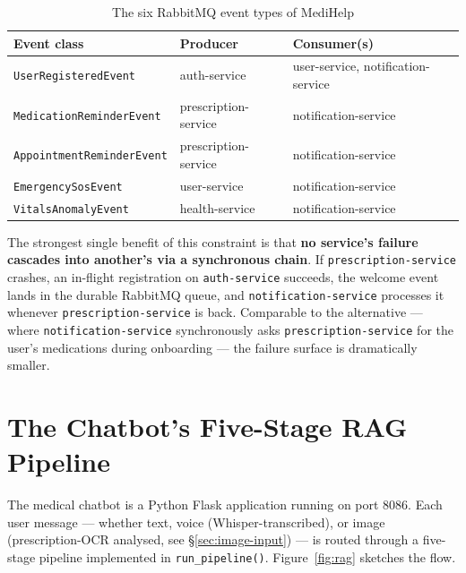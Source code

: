 \documentclass[12pt]{caltech_thesis}
\begin{document}
\begin{table}[H]
    \centering
    \caption{The six RabbitMQ event types of MediHelp}
    \label{tab:events}
    \begin{tabular}{lll}
        \toprule
        Event class                & Producer            & Consumer(s) \\
        \midrule
        \texttt{UserRegisteredEvent}  & auth-service        & user-service, notification-service  \\
        \texttt{MedicationReminderEvent} & prescription-service & notification-service             \\
        \texttt{AppointmentReminderEvent} & prescription-service & notification-service            \\
        \texttt{EmergencySosEvent}    & user-service        & notification-service                \\
        \texttt{VitalsAnomalyEvent}   & health-service      & notification-service                \\
        \bottomrule
    \end{tabular}
\end{table}

The strongest single benefit of this constraint is that \textbf{no service's
failure cascades into another's via a synchronous chain}. If
\texttt{prescription-service} crashes, an in-flight registration on
\texttt{auth-service} succeeds, the welcome event lands in the durable
RabbitMQ queue, and \texttt{notification-service} processes it whenever
\texttt{prescription-service} is back. Comparable to the alternative ---
where \texttt{notification-service} synchronously asks
\texttt{prescription-service} for the user's medications during onboarding
--- the failure surface is dramatically smaller.

\section{The Chatbot's Five-Stage RAG Pipeline}
\label{sec:rag}

The medical chatbot is a Python Flask application running on port 8086.
Each user message --- whether text, voice (Whisper-transcribed), or image
(prescription-OCR analysed, see \S\ref{sec:image-input}) --- is routed
through a five-stage pipeline implemented in \texttt{run\_pipeline()}.
Figure~\ref{fig:rag} sketches the flow.
\end{document}
